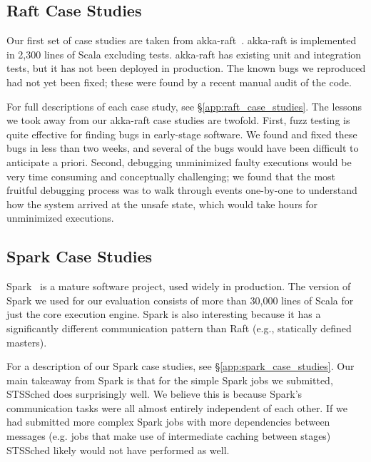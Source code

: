 \subsection{Raft Case Studies} Our first set of case studies are taken from
akka-raft~\cite{akka-raft}. akka-raft is implemented in 2,300 lines of Scala excluding tests. akka-raft has existing unit and integration tests, but it
has not been deployed in production. The known
bugs we reproduced had not yet been fixed; these were
found by a recent manual audit of the code.

For full descriptions of each case study, see \S\ref{app:raft_case_studies}.
The lessons we took away from our akka-raft case studies are twofold. First,
fuzz testing is quite effective for finding bugs in
early-stage software.
We found and fixed these
bugs in less than two weeks, and several of the
bugs would have
been difficult to anticipate a priori. Second, debugging unminimized faulty
executions would be very time consuming and conceptually challenging;
we found that the most fruitful debugging process was to walk through events
one-by-one to understand how the system arrived at the unsafe state, which would take hours for unminimized executions.

\subsection{Spark Case Studies}

Spark~\cite{spark_repo} is a mature software project, used
widely in production. The version of Spark we used for our evaluation consists of more
than 30,000 lines of Scala for just the core execution engine.
Spark is also interesting because it has a significantly different
communication pattern than
Raft (e.g., statically defined masters).

For a description of our Spark case studies, see \S\ref{app:spark_case_studies}.
Our main takeaway from Spark is that for the simple Spark jobs we submitted,
STSSched does
surprisingly well. We believe this
is because Spark's communication tasks were all almost entirely independent
of each other. If we had
submitted more complex Spark jobs with more dependencies between messages
(e.g. jobs that make use of intermediate
caching between stages) STSSched likely would not have performed as well.


